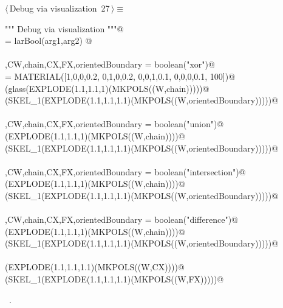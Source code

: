 \documentclass[11pt,oneside]{article}	%
\begin{document}
	
\begin{flushleft} \small \label{scrap34}
\protect{}$\langle\,$Debug via visualization\nobreak\ {\footnotesize 27}$\,\rangle\equiv$
\vspace{-1ex}
\begin{list}{}{} \item
\mbox{}\verb@""" Debug via visualization """@\\
\mbox{}\verb@boolean = larBool(arg1,arg2)  @\\
\mbox{}\verb@@\\
\mbox{}\verb@W,CW,chain,CX,FX,orientedBoundary = boolean("xor")@\\
\mbox{}\verb@glass = MATERIAL([1,0,0,0.2,  0,1,0,0.2,  0,0,1,0.1, 0,0,0,0.1, 100])@\\
\mbox{}\verb@VIEW(glass(EXPLODE(1.1,1.1,1)(MKPOLS((W,chain)))))@\\
\mbox{}\verb@VIEW(SKEL_1(EXPLODE(1.1,1.1,1.1)(MKPOLS((W,orientedBoundary)))))@\\
\mbox{}\verb@@\\
\mbox{}\verb@W,CW,chain,CX,FX,orientedBoundary = boolean("union")@\\
\mbox{}\verb@VIEW(EXPLODE(1.1,1.1,1)(MKPOLS((W,chain))))@\\
\mbox{}\verb@VIEW(SKEL_1(EXPLODE(1.1,1.1,1.1)(MKPOLS((W,orientedBoundary)))))@\\
\mbox{}\verb@@\\
\mbox{}\verb@W,CW,chain,CX,FX,orientedBoundary = boolean("intersection")@\\
\mbox{}\verb@VIEW(EXPLODE(1.1,1.1,1)(MKPOLS((W,chain))))@\\
\mbox{}\verb@VIEW(SKEL_1(EXPLODE(1.1,1.1,1.1)(MKPOLS((W,orientedBoundary)))))@\\
\mbox{}\verb@@\\
\mbox{}\verb@W,CW,chain,CX,FX,orientedBoundary = boolean("difference")@\\
\mbox{}\verb@VIEW(EXPLODE(1.1,1.1,1)(MKPOLS((W,chain))))@\\
\mbox{}\verb@VIEW(SKEL_1(EXPLODE(1.1,1.1,1.1)(MKPOLS((W,orientedBoundary)))))@\\
\mbox{}\verb@@\\
\mbox{}\verb@VIEW(EXPLODE(1.1,1.1,1.1)(MKPOLS((W,CX))))@\\
\mbox{}\verb@VIEW(SKEL_1(EXPLODE(1.1,1.1,1.1)(MKPOLS((W,FX)))))@\\
\mbox{}\verb@@{\NWsep}
\end{list}
\vspace{-1ex}
\footnotesize\addtolength{\baselineskip}{-1ex}
\begin{list}{}{\setlength{\itemsep}{-\parsep}\setlength{\itemindent}{-\leftmargin}}
\item \NWtxtMacroRefIn\ .
\end{list}
\end{flushleft}
\end{document}
